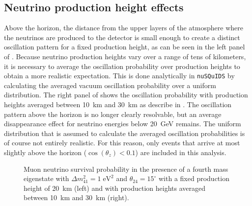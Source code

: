 \subsection{Neutrino production height effects}
Above the horizon, the distance from the upper layers of the atmosphere where the neutrinos are produced to the detector is small enough to create a distinct oscillation pattern for a fixed production height, as can be seen in the left panel of .
Because neutrino production heights vary over a range of tens of kilometers, it is necessary to average the oscillation probability over production heights to obtain a more realistic expectation.
This is done analytically in \texttt{nuSQuIDS}\cite{squids, nusquids} by calculating the averaged vacuum oscillation probability over a uniform distribution.
The right panel of  shows the oscillation probability with production heights averaged between 10~km and 30~km as describe in .
The oscillation pattern above the horizon is no longer clearly resolvable, but an average disappearance effect for neutrino energies below 20~GeV remains.
The uniform distribution that is assumed to calculate the averaged oscillation probabilities is of course not entirely realistic.
For this reason, only events that arrive at most slightly above the horizon ($\cos(\theta_z)<0.1$) are included in this analysis.

\begin{figure}
    \centering
    
    \caption{Muon neutrino survival probability in the presence of a fourth mass eigenstate with $\Delta m^2_{41}=1\;\mathrm{eV^2}$ and $\theta_{24}=15^\circ$ with a fixed production height of 20~km (left) and with production heights averaged between 10~km and 30~km (right).\label{fig:numu_survival_1eV2_full_range}}
\end{figure}

